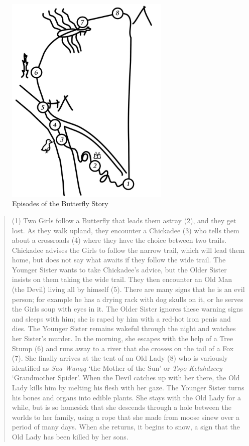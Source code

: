 \begin{figure}[!ht]
    \centering
    \includegraphics[width=0.7\textwidth]{figures/brucks-fig1} %
    \caption{Episodes of the Butterfly Story}
    \label{fig:epmap}
\end{figure}

\begin{quote}
(1) Two Girls follow a Butterfly that leads them astray (2), and they get lost. As they walk upland, they encounter a Chickadee (3) who tells them about a crossroads (4) where they have the choice between two trails. Chickadee advises the Girls to follow the narrow trail, which will lead them home, but does not say what awaits if they follow the wide trail. The Younger Sister wants to take Chickadee's advice, but the Older Sister insists on them taking the wide trail. They then encounter an Old Man (the Devil) living all by himself (5). There are many signs that he is an evil person; for example he has a drying rack with dog skulls on it, or he serves the Girls soup with eyes in it. The Older Sister ignores these warning signs and sleeps with him; she is raped by him with a red-hot iron penis and dies. The Younger Sister remains wakeful through the night and watches her Sister's murder. In the morning, she escapes with the help of a Tree Stump (6) and runs away to a river that she crosses on the tail of a Fox (7). She finally arrives at the tent of an Old Lady (8) who is variously identified as {\em Saa Wunąą} `the Mother of the Sun' or {\em Tsǫǫ Kelahdzeey} `Grandmother Spider'. When the Devil catches up with her there, the Old Lady kills him by melting his flesh with her gaze. The Younger Sister turns his bones and organs into edible plants. She stays with the Old Lady for a while, but is so homesick that she descends through a hole between the worlds to her family, using a rope that she made from moose sinew over a period of many days. When she returns, it begins to snow, a sign that the Old Lady has been killed by her sons.
\end{quote}

